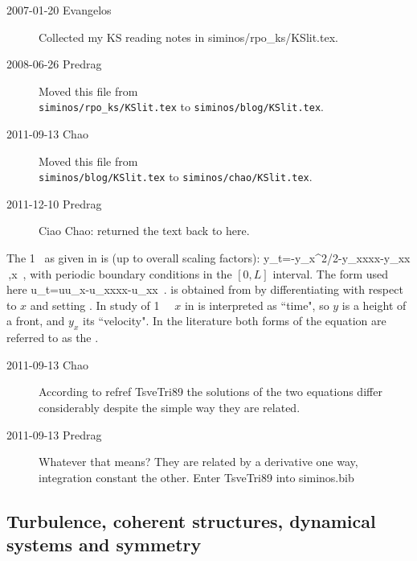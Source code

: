 \begin{description}

\item[2007-01-20 Evangelos]
Collected my KS reading notes in siminos/rpo\_ks/KSlit.tex.

\item[2008-06-26 Predrag]
Moved this file from
\\
\texttt{siminos/rpo\_ks/KSlit.tex} to
\texttt{siminos/blog/KSlit.tex}.

\item[2011-09-13 Chao]
Moved this file from
\\
\texttt{siminos/blog/KSlit.tex} to \texttt{siminos/chao/KSlit.tex}.

\item[2011-12-10 Predrag] Ciao Chao: returned the text back to here.

\end{description}

The {1\dmn} \KSe\ as given in  is (up to overall scaling
factors):
\beq
    y_t=-y_x^2/2-y_{xxxx}-y_{xx}
\,,\qquad       x \in [0,L]
\,,
    \label{eq:KSeOR}
\eeq
with periodic boundary conditions in the $[0,L]$ interval. The form used
here
\beq
    u_t=uu_x-u_{xxxx}-u_{xx}
\,.
    \label{eq:KSeAP}
\eeq
is obtained from  by differentiating with respect to $x$
and setting .
In study of {1\dmn} \KS\ \eqva\ $x$ in 
is interpreted as ``time", so $y$ is a height of a front, and $y_x$ its ``velocity".
In the literature  both forms of the equation are
referred to as the \KSe.

\begin{description}
\item[2011-09-13 Chao]

 According to refref {TsveTri89} the solutions of the two equations
 differ considerably despite the simple way they are related.

\item[2011-09-13 Predrag]
{Whatever that means? They are related by a derivative one way,
 integration constant the other. Enter TsveTri89 into siminos.bib}
\end{description}


\subsection{Turbulence, coherent structures, dynamical systems and
symmetry}
\label{s:Holmes96}

